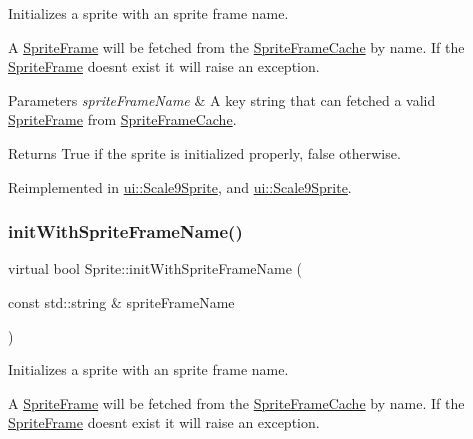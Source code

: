 Initializes a sprite with an sprite frame name.

A \hyperlink{classSpriteFrame}{Sprite\+Frame} will be fetched from the \hyperlink{classSpriteFrameCache}{Sprite\+Frame\+Cache} by name. If the \hyperlink{classSpriteFrame}{Sprite\+Frame} doesn\textquotesingle{}t exist it will raise an exception.


\begin{DoxyParams}{Parameters}
{\em sprite\+Frame\+Name} & A key string that can fetched a valid \hyperlink{classSpriteFrame}{Sprite\+Frame} from \hyperlink{classSpriteFrameCache}{Sprite\+Frame\+Cache}. \\
\hline
\end{DoxyParams}
\begin{DoxyReturn}{Returns}
True if the sprite is initialized properly, false otherwise. 
\end{DoxyReturn}


Reimplemented in \hyperlink{classui_1_1Scale9Sprite_ac28a73f9652a1bffc597085b06087dda}{ui\+::\+Scale9\+Sprite}, and \hyperlink{classui_1_1Scale9Sprite_ad7b24ae46593942f22091bbc76df9e41}{ui\+::\+Scale9\+Sprite}.

\mbox{\label{classSprite_ae071a06f28d584ed403c3ea0f67d8ddd}} 
\subsubsection{\texorpdfstring{init\+With\+Sprite\+Frame\+Name()}{initWithSpriteFrameName()}\hspace{0.1cm}{\footnotesize\ttfamily [2/2]}}
{\footnotesize\ttfamily virtual bool Sprite\+::init\+With\+Sprite\+Frame\+Name (\begin{DoxyParamCaption}\item[{const std\+::string \&}]{sprite\+Frame\+Name }\end{DoxyParamCaption})\hspace{0.3cm}{\ttfamily [virtual]}}

Initializes a sprite with an sprite frame name.

A \hyperlink{classSpriteFrame}{Sprite\+Frame} will be fetched from the \hyperlink{classSpriteFrameCache}{Sprite\+Frame\+Cache} by name. If the \hyperlink{classSpriteFrame}{Sprite\+Frame} doesn\textquotesingle{}t exist it will raise an exception.


